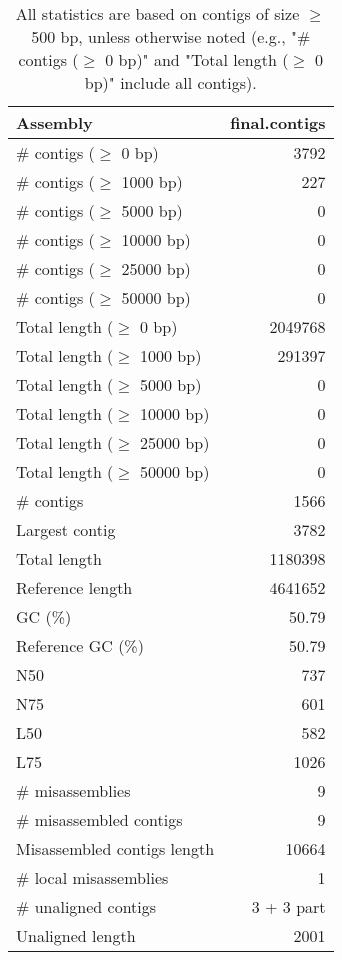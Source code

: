 \documentclass[12pt,a4paper]{article}
\begin{document}
\begin{table}[ht]
\begin{center}
\caption{All statistics are based on contigs of size $\geq$ 500 bp, unless otherwise noted (e.g., "\# contigs ($\geq$ 0 bp)" and "Total length ($\geq$ 0 bp)" include all contigs).}
\begin{tabular}{|l*{1}{|r}|}
\hline
Assembly & final.contigs \\ \hline
\# contigs ($\geq$ 0 bp) & 3792 \\ \hline
\# contigs ($\geq$ 1000 bp) & 227 \\ \hline
\# contigs ($\geq$ 5000 bp) & 0 \\ \hline
\# contigs ($\geq$ 10000 bp) & 0 \\ \hline
\# contigs ($\geq$ 25000 bp) & 0 \\ \hline
\# contigs ($\geq$ 50000 bp) & 0 \\ \hline
Total length ($\geq$ 0 bp) & 2049768 \\ \hline
Total length ($\geq$ 1000 bp) & 291397 \\ \hline
Total length ($\geq$ 5000 bp) & 0 \\ \hline
Total length ($\geq$ 10000 bp) & 0 \\ \hline
Total length ($\geq$ 25000 bp) & 0 \\ \hline
Total length ($\geq$ 50000 bp) & 0 \\ \hline
\# contigs & 1566 \\ \hline
Largest contig & 3782 \\ \hline
Total length & 1180398 \\ \hline
Reference length & 4641652 \\ \hline
GC (\%) & 50.79 \\ \hline
Reference GC (\%) & 50.79 \\ \hline
N50 & 737 \\ \hline
N75 & 601 \\ \hline
L50 & 582 \\ \hline
L75 & 1026 \\ \hline
\# misassemblies & 9 \\ \hline
\# misassembled contigs & 9 \\ \hline
Misassembled contigs length & 10664 \\ \hline
\# local misassemblies & 1 \\ \hline
\# unaligned contigs & 3 + 3 part \\ \hline
Unaligned length & 2001 \\ \hline

\end{tabular}
\end{center}
\end{table}
\end{document}
